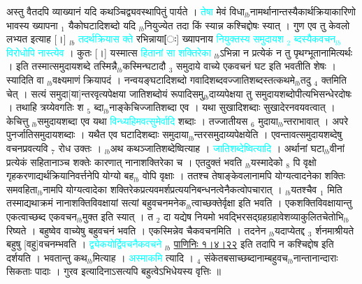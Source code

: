 \documentclass[article,12pt,a4paper]{memoir}%
\newcommand{\quotelemma}[1]{\textcolor{cyan}{#1}}
\begin{document}
	  
	  \pstart \leavevmode%
	\hphantom{.}अस्तु वैतदपि व्याख्यानं यदि कथञ्चिद्व्यवस्थापितुं पार्यते । \quotelemma{तेषा} मेवं विधा{\tiny $_{lb}$}नामर्थानान्तस्यैकार्थक्रियाकारिणो भावस्य ख्यापना {\tiny $_{1}$} यैकोघटादिशब्दो यदि {\tiny $_{lb}$}नियुज्येत तदा किं स्यान्न कश्चिद्दोषः स्यात् । गुण एव तु केवलो लभ्यत इत्याह [।] {\tiny $_{lb}$} \quotelemma{तदर्थक्रियास\edtext{}{\lemma{क्रियास}\Bfootnote{? श}}} \quotelemma{क्ते} रभिन्नाया[ः] ख्यापनाय \quotelemma{नियुक्तस्य समुदायश {\tiny $_{2}$} ब्दस्यैकवचन{\tiny $_{lb}$}विरोधोपि नास्त्येव} \cite[3a2]{vn-msN} । कुतः [।] यस्मात्स \quotelemma{हितानां सा शक्तिरेका} \cite[3a3]{vn-msN} {\tiny $_{lb}$}ऽभिन्ना न प्रत्येकं न तु पृथग्भूतानामित्यर्थः । इति तस्मात्समुदायशब्दे तस्मिन्नै{\tiny $_{lb}$}कस्मिन्घटादौ {\tiny $_{3}$} समुदाये वाच्ये एकवचनं घट इति भवतीति शेषः । स्यादिति वा {\tiny $_{lb}$}वक्ष्यमाणं क्रियापदं । नन्वयङ्घटादिशब्दो गवादिशब्दवज्जातिशब्दस्तत्कथमे{\tiny $_{lb}$}तदु {\tiny $_{4}$} क्तमिति चेत् । सत्यं समुदा[या]न्तरवृत्यपेक्षया जातिशब्दोयं रूपादिसमु{\tiny $_{lb}$}दाय्यपेक्षया तु समुदायशब्दोपीत्यभिसन्धेरदोषः । तथाहि त्रय्येवगतिः श {\tiny $_{5}$} ब्दा{\tiny $_{lb}$}नाङ्केचिज्जातिशब्दा एव । यथा सुखादिशब्दाः सुखादेरनवयवत्वात् । केचित्तु {\tiny $_{lb}$}समुदायशब्दा एव यथा \quotelemma{विन्ध्यहिमवत्सुमेर्वादि} शब्दाः । तज्जातीयस {\tiny $_{6}$} मुदाया{\tiny $_{lb}$}न्तराभावात् । अपरे पुनर्जातिसमुदायशब्दाः । यथैत एव घटादिशब्दाः समुदाया{\tiny $_{lb}$}न्तरसमुदाय्यपेक्षयेति । एवन्तावत्समुदायशब्देषु वचनप्रवत्यवि {\tiny $_{7}$} रोध उक्तः । {\tiny $_{lb}$}अथ कथञ्जातिशब्देष्वित्याह । \quotelemma{जातिशब्देष्वित्यादि} \cite[3a3]{vn-msN} । अर्थानां घटा{\tiny $_{lb}$}वीनां प्रत्येकं सहितानाञ्च शक्तेः कारणात् नानाशक्तिरेका च । एतदुक्तं भवति {\tiny $_{lb}$}यस्मादेको {\tiny $_{8}$} \leavevmode{} पि वृक्षो गृहकरणाद्यर्थक्रियानिवर्त्तनेपि योग्यो बह{\tiny $_{lb}$} \leavevmode{} वोपि वृक्षाः । ततश्च तेषाङ्केवलानामपि योग्यत्वादनेका शक्तिः समवहिता{\tiny $_{lb}$}नामपि योग्यत्वादेका शक्तिरेकप्रत्यवमर्शप्रत्ययनिबन्धनत्वेनैकत्वोपचारात् । {\tiny $_{lb}$}यतश्चैव {\tiny $_{1}$} मिति तस्माद्यथाक्रमं नानाशक्तिविवक्षायां सत्यां बहुवचनमनेक{\tiny $_{lb}$}त्वाच्छक्तेर्वृक्षा इति भवति । एकशक्तिविवक्षायान्तु एकत्वाच्छब्द एकवचन{\tiny $_{lb}$}मुक्त इति स्यात् । त {\tiny $_{2}$} दा यद्येष नियमो भवद्भिरसद्ग्रहग्रहावेशव्याकुलितचेतोभि{\tiny $_{lb}$}रिष्यते । बहुष्वेव वाच्येषु बहुवचनं भवति । एकस्मिन्नेव चैकवचनमिति । तदनेन {\tiny $_{lb}$}यदाप्येतद्द {\tiny $_{3}$} र्शनमाश्रीयते बहुषु [वहु]वचनम्भवति । \quotelemma{द्व्येकयोर्द्विवचनैकवचने} {\tiny $_{lb}$} \href{http://sarit.indology.info/?cref=P\%C4\%81.1.4.22}{पाणिनिः १।४।२२} इति तदापि न कश्चिद्दोष इति दर्शयति । भवतान्तु कथ{\tiny $_{lb}$}मित्याह । \quotelemma{अस्माकमि} \cite[3a4]{vn-msN} त्यादि । {\tiny $_{4}$} संकेतबसाच्छब्दानाम्बहुवच{\tiny $_{lb}$}नान्तानान्दाराः सिकताः पादाः । गुरव इत्यादिनाऽसत्यपि बहुत्वेऽभिधेयस्य वृत्तिः ॥
\end{document}
